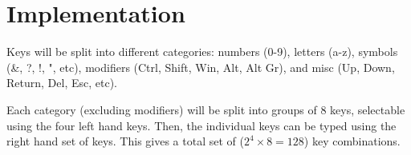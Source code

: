 \documentclass{article}
\begin{document}
\section{Implementation}
Keys will be split into different categories: numbers (0-9), letters (a-z), symbols (\&, ?, !, ", etc), modifiers (Ctrl, Shift, Win, Alt, Alt Gr), and misc (Up, Down, Return, Del, Esc, etc).

Each category (excluding modifiers) will be split into groups of 8 keys, selectable using the four left hand keys. Then, the individual keys can be typed using the right hand set of keys. This gives a total set of ($2^4 \times 8 = 128$) key combinations.
\end{document}
